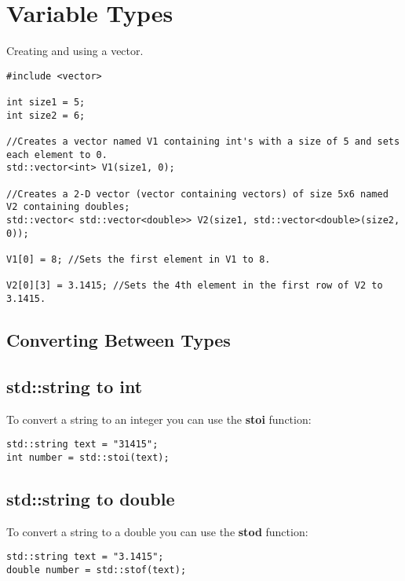 \section{Variable Types}

Creating and using a vector.
\begin{lstlisting}
#include <vector>

int size1 = 5;
int size2 = 6;

//Creates a vector named V1 containing int's with a size of 5 and sets each element to 0. 
std::vector<int> V1(size1, 0); 

//Creates a 2-D vector (vector containing vectors) of size 5x6 named V2 containing doubles;
std::vector< std::vector<double>> V2(size1, std::vector<double>(size2, 0)); 

V1[0] = 8; //Sets the first element in V1 to 8.

V2[0][3] = 3.1415; //Sets the 4th element in the first row of V2 to 3.1415.

\end{lstlisting}













\subsection{Converting Between Types}

\subsection*{std::string to int}
To convert a string to an integer you can use the \textbf{stoi} function:
\begin{lstlisting}
std::string text = "31415";
int number = std::stoi(text);
\end{lstlisting}

\subsection*{std::string to double}
To convert a string to a double you can use the \textbf{stod} function:
\begin{lstlisting}
std::string text = "3.1415";
double number = std::stof(text);
\end{lstlisting}

